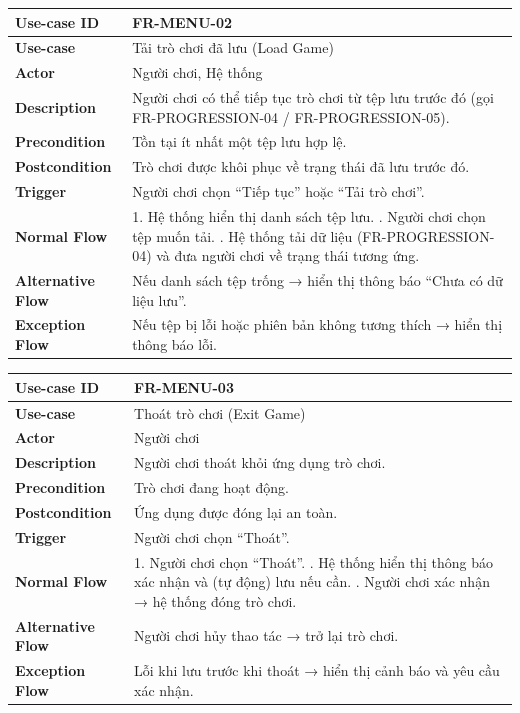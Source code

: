 \begin{table}[H]
\centering
\begin{tabular}{|p{4cm}|p{10cm}|}
\hline
\textbf{Use-case ID} & FR-MENU-02 \\ \hline
\textbf{Use-case} & Tải trò chơi đã lưu (Load Game) \\ \hline
\textbf{Actor} & Người chơi, Hệ thống \\ \hline
\textbf{Description} & Người chơi có thể tiếp tục trò chơi từ tệp lưu trước đó (gọi FR-PROGRESSION-04 / FR-PROGRESSION-05). \\ \hline
\textbf{Precondition} & Tồn tại ít nhất một tệp lưu hợp lệ. \\ \hline
\textbf{Postcondition} & Trò chơi được khôi phục về trạng thái đã lưu trước đó. \\ \hline
\textbf{Trigger} & Người chơi chọn “Tiếp tục” hoặc “Tải trò chơi”. \\ \hline
\textbf{Normal Flow} &
1. Hệ thống hiển thị danh sách tệp lưu. \newline
2. Người chơi chọn tệp muốn tải. \newline
3. Hệ thống tải dữ liệu (FR-PROGRESSION-04) và đưa người chơi về trạng thái tương ứng. \\ \hline
\textbf{Alternative Flow} &
Nếu danh sách tệp trống → hiển thị thông báo “Chưa có dữ liệu lưu”. \\ \hline
\textbf{Exception Flow} &
Nếu tệp bị lỗi hoặc phiên bản không tương thích → hiển thị thông báo lỗi. \\ \hline
\end{tabular}
\end{table}


\begin{table}[H]
\centering
\begin{tabular}{|p{4cm}|p{10cm}|}
\hline
\textbf{Use-case ID} & FR-MENU-03 \\ \hline
\textbf{Use-case} & Thoát trò chơi (Exit Game) \\ \hline
\textbf{Actor} & Người chơi \\ \hline
\textbf{Description} & Người chơi thoát khỏi ứng dụng trò chơi. \\ \hline
\textbf{Precondition} & Trò chơi đang hoạt động. \\ \hline
\textbf{Postcondition} & Ứng dụng được đóng lại an toàn. \\ \hline
\textbf{Trigger} & Người chơi chọn “Thoát”. \\ \hline
\textbf{Normal Flow} &
1. Người chơi chọn “Thoát”. \newline
2. Hệ thống hiển thị thông báo xác nhận và (tự động) lưu nếu cần. \newline
3. Người chơi xác nhận → hệ thống đóng trò chơi. \\ \hline
\textbf{Alternative Flow} &
Người chơi hủy thao tác → trở lại trò chơi. \\ \hline
\textbf{Exception Flow} &
Lỗi khi lưu trước khi thoát → hiển thị cảnh báo và yêu cầu xác nhận. \\ \hline
\end{tabular}
\end{table}


